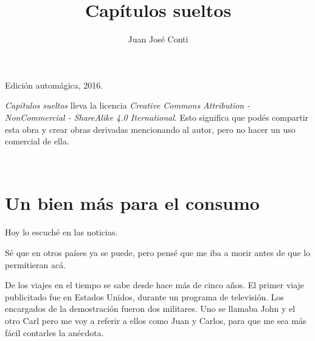 \documentclass[12pt,twoside,openright]{book}
\title{Capítulos sueltos}
\author{Juan José Conti}
\date{}
\begin{document}

\pagestyle{plain}


%
%

\maketitle

\cleardoublepage

\thispagestyle{empty}
\noindent
Edición automágica, 2016.\\

\vspace{0.5cm}

\noindent
\emph{Capítulos sueltos} lleva la licencia
\emph{Creative Commons Attribution - NonCommercial - ShareAlike 4.0 Iternational}.
Esto significa que podés compartir esta obra y crear obras derivadas
mencionando al autor, pero no ha\-cer un uso comercial de ella.

\vfill

\noindent
\\

\cleardoublepage


\renewcommand*\contentsname{Índice}

\tableofcontents

\cleardoublepage







\chapter*{Un bien más para el consumo} 



Hoy lo escuché en las noticias.

Sé que en otros países ya se puede, pero pensé que me iba a morir antes de que lo permitieran acá.

De los viajes en el tiempo se sabe desde hace más de cinco años. El primer viaje publicitado fue en Estados Unidos, durante un programa de televisión. Los encargados de la demostración fueron dos militares. Uno se llamaba John y el otro Carl pero me voy a referir a ellos como Juan y Carlos, para que me sea más fácil contarles la anécdota.
\end{document}

